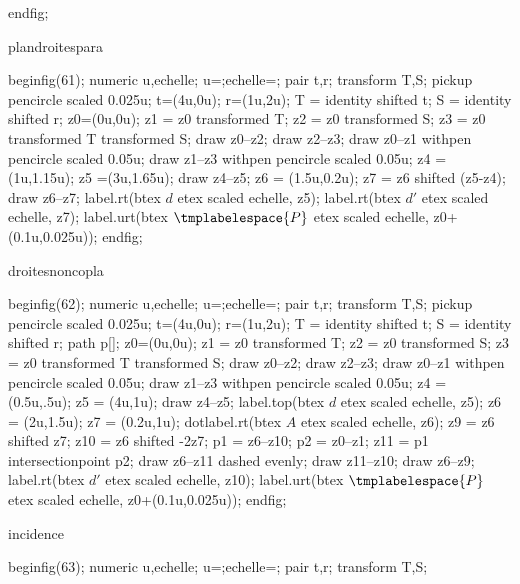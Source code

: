 {{{\begin{mplibcode}[PfLAE]
				endfig;
			\end{mplibcode}
		}%
		{plandroitespara}{%
			\begin{mplibcode}[PfLAF]
				beginfig(61);
				numeric u,echelle;
				u=\scaleminischemspace*1cm;echelle=\scaleminischemspace;
				pair t,r;
				transform T,S;
				pickup pencircle scaled 0.025u;
				t=(4u,0u); r=(1u,2u);
				T = identity shifted t;
				S = identity shifted r;
				z0=(0u,0u);
				z1 = z0 transformed T;
				z2 = z0 transformed S;
				z3 = z0 transformed T transformed S;
				draw z0--z2;
				draw z2--z3;
				draw z0--z1 withpen pencircle scaled 0.05u;
				draw z1--z3 withpen pencircle scaled 0.05u;
				z4 = (1u,1.15u);
				z5 =(3u,1.65u);
				draw z4--z5;
				z6 = (1.5u,0.2u);
				z7 = z6 shifted (z5-z4);
				draw z6--z7;
				label.rt(btex $d$ etex scaled echelle, z5);
				label.rt(btex $d'$ etex scaled echelle, z7);
				label.urt(btex $\tmplabelespace{P}$ etex scaled echelle, z0+(0.1u,0.025u));
				endfig;
			\end{mplibcode}
		}%
		{droitesnoncopla}{%
			\begin{mplibcode}[PfLAG]
				beginfig(62);
				numeric u,echelle;
				u=\scaleminischemspace*1cm;echelle=\scaleminischemspace;
				pair t,r;
				transform T,S;
				pickup pencircle scaled 0.025u;
				t=(4u,0u); r=(1u,2u);
				T = identity shifted t;
				S = identity shifted r;
				path p[];
				z0=(0u,0u);
				z1 = z0 transformed T;
				z2 = z0 transformed S;
				z3 = z0 transformed T transformed S;
				draw z0--z2;
				draw z2--z3;
				draw z0--z1 withpen pencircle scaled 0.05u;
				draw z1--z3 withpen pencircle scaled 0.05u;
				z4 = (0.5u,.5u);
				z5 = (4u,1u);
				draw z4--z5;
				label.top(btex $d$ etex scaled echelle, z5);
				z6 = (2u,1.5u);
				z7 = (0.2u,1u);
				dotlabel.rt(btex $A$ etex scaled echelle, z6);
				z9 = z6 shifted z7;
				z10 = z6 shifted -2z7;
				p1 = z6--z10;
				p2 = z0--z1;
				z11 = p1 intersectionpoint p2;
				draw z6--z11 dashed evenly;
				draw z11--z10;
				draw z6--z9;
				label.rt(btex $d'$ etex scaled echelle, z10);
				label.urt(btex $\tmplabelespace{P}$ etex scaled echelle, z0+(0.1u,0.025u));
				endfig;
			\end{mplibcode}
		}%
		{incidence}{%
			\begin{mplibcode}[PfLAH]
				beginfig(63);
				numeric u,echelle;
				u=\scaleminischemspace*1cm;echelle=\scaleminischemspace;
				pair t,r;
				transform T,S;

\end{mplibcode}}}}
